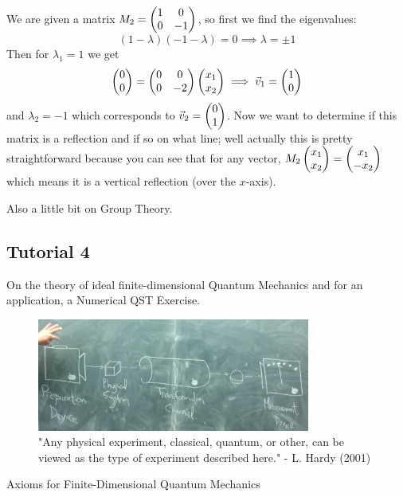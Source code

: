 \documentclass[english, 11pt]{article}
\begin{document}
      We are given a matrix $M_2 = \left(\begin{matrix}1 & 0 \\ 0 & -1\end{matrix}\right)$, so first we find the eigenvalues:
      \[ (1-\lambda)(-1 - \lambda) = 0 \implies \lambda = \pm 1 \]
      Then for $\lambda_1 = 1$ we get
      \[ \left(\begin{matrix}0\\0\end{matrix}\right) = \left(\begin{matrix}0 & 0 \\ 0 & -2\end{matrix}\right)\left(\begin{matrix}x_1 \\ x_2\end{matrix}\right) \implies {\vec{v}}_1 = \left(\begin{matrix}1 \\ 0\end{matrix}\right) \]
      and $\lambda_2 = -1$ which corresponds to ${\vec{v}}_2 = \left(\begin{matrix}0 \\ 1\end{matrix}\right)$. Now we want to determine if this matrix is a reflection and if so on what line; well actually this is pretty straightforward because you can see that for any vector, $M_2\left(\begin{matrix}x_1\\x_2\end{matrix}\right) = \left(\begin{matrix}x_1\\-x_2\end{matrix}\right)$ which means it is a vertical reflection (over the $x$-axis).
      \newline

      Also a little bit on Group Theory.

     \subsection{Tutorial 4}

      On the theory of ideal finite-dimensional Quantum Mechanics and for an application, a Numerical QST Exercise.

      \begin{figure}[b!]
            \centering
            \includegraphics[width=0.8\textwidth]{any_physics.png}
            \caption{"Any physical experiment, classical, quantum, or other, can be viewed as the type of experiment described here." - L. Hardy (2001)}
      \end{figure}

      Axioms for Finite-Dimensional Quantum Mechanics
\end{document}
